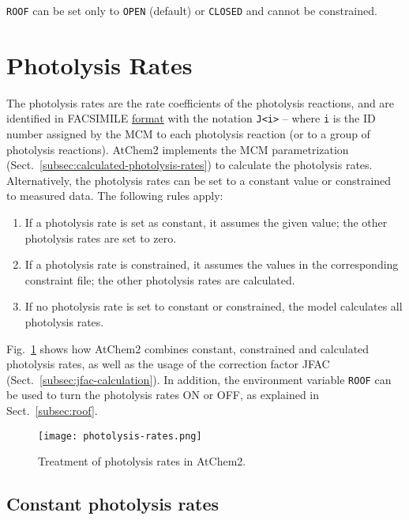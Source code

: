 \texttt{ROOF} can be set only to \texttt{OPEN} (default) or
\texttt{CLOSED} and cannot be constrained.

\section{Photolysis Rates} \label{sec:photolysis-rates}

The photolysis rates are the rate coefficients of the photolysis
reactions, and are identified in FACSIMILE
\hyperref[subsec:facsimile-format]{format} with the notation
\verb|J<i>| -- where \texttt{i} is the ID number assigned by the MCM
to each photolysis reaction (or to a group of photolysis
reactions). AtChem2 implements the MCM parametrization
(Sect.~\ref{subsec:calculated-photolysis-rates}) to calculate the
photolysis rates. Alternatively, the photolysis rates can be set to a
constant value or constrained to measured data. The following rules
apply:

\begin{enumerate}
\item If a photolysis rate is set as constant, it assumes the given
  value; the other photolysis rates are set to zero.
\item If a photolysis rate is constrained, it assumes the values in
  the corresponding constraint file; the other photolysis rates are
  calculated.
\item If no photolysis rate is set to constant or constrained, the
  model calculates all photolysis rates.
\end{enumerate}

Fig.~\ref{fig:photol} shows how AtChem2 combines constant,
constrained and calculated photolysis rates, as well as the usage of
the correction factor JFAC (Sect.~\ref{subsec:jfac-calculation}). In
addition, the environment variable \texttt{ROOF} can be used to turn
the photolysis rates ON or OFF, as explained in Sect.~\ref{subsec:roof}.

\begin{figure}[htb]
  \centering
  \texttt{[image: photolysis-rates.png]}
  \caption{Treatment of photolysis rates in AtChem2.}
  \label{fig:photol}
\end{figure}

\subsection{Constant photolysis rates} \label{subsec:constant-photolysis-rates}

